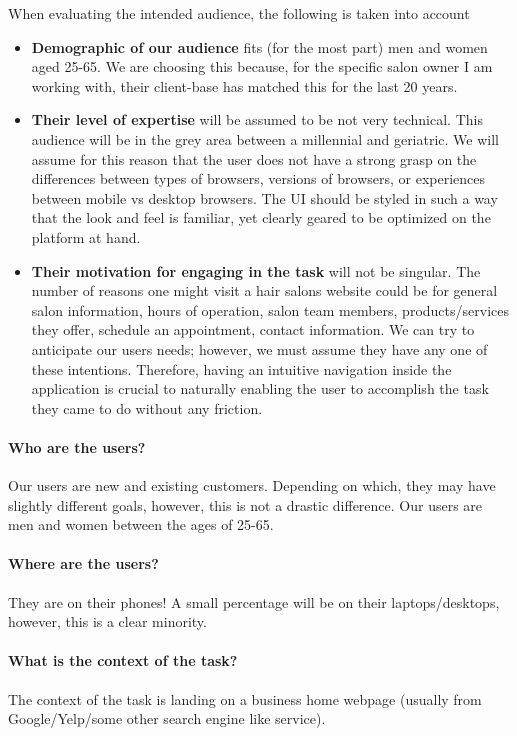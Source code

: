 When evaluating the intended audience, the following is taken into account

\begin{itemize}
\item
  \textbf{Demographic of our audience} fits (for the most part) men and women aged 25-65. We are choosing this because, for the specific salon owner I am working with, their client-base has matched this for the last 20 years.
\item
  \textbf{Their level of expertise} will be assumed to be not very technical. This audience will be in the grey area between a millennial and geriatric. We will assume for this reason that the user does not have a strong grasp on the differences between types of browsers, versions of browsers, or experiences between mobile vs desktop browsers. The UI should be styled in such a way that the look and feel is familiar, yet clearly geared to be optimized on the platform at hand.
\item
  \textbf{Their motivation for engaging in the task} will not be singular. The number of reasons one might visit a hair salons website could be for general salon information, hours of operation, salon team members, products/services they offer, schedule an appointment, contact information. We can try to anticipate our users needs; however, we must assume they have any one of these intentions. Therefore, having an intuitive navigation inside the application is crucial to naturally enabling the user to accomplish the task they came to do without any friction.
\end{itemize}

\paragraph{Who are the users?}
Our users are new and existing customers. Depending on which, they may have slightly different goals, however, this is not a drastic difference. Our users are men and women between the ages of 25-65.

\paragraph{Where are the users?}
They are on their phones! A small percentage will be on their laptops/desktops, however, this is a clear minority.

\paragraph{What is the context of the task?}
The context of the task is landing on a business home webpage (usually from Google/Yelp/some other search engine like service).

